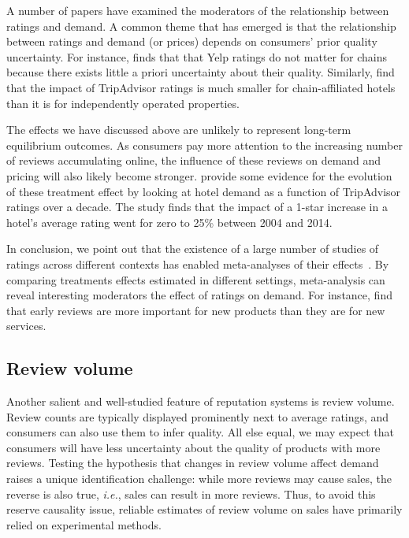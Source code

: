 \documentclass[letter,12pt]{article}
\begin{document}
A number of papers have examined the moderators of the relationship between
ratings and demand. A common theme that has emerged is that the relationship
between ratings and demand (or prices) depends on consumers' prior quality
uncertainty. For instance, \citet{luca2016reviews} finds that that Yelp
ratings do not matter for chains because there exists little a priori
uncertainty about their quality. Similarly, \citet{lewis2016welfare} find that
the impact of TripAdvisor ratings is much smaller for chain-affiliated hotels
than it is for independently operated properties.

The effects we have discussed above are unlikely to represent long-term
equilibrium outcomes. As consumers pay more attention to the increasing number
of reviews accumulating online, the influence of these reviews on demand and
pricing will also likely become stronger. \cite{lewis2016welfare} provide some
evidence for the evolution of these treatment effect by looking at hotel
demand as a function of TripAdvisor ratings over a decade. The study finds
that the impact of a 1-star increase in a hotel's average rating went for zero
to 25\% between 2004 and 2014.

In conclusion, we point out that the existence of a large number of studies of
ratings across different contexts has enabled meta-analyses of their
effects~\citep{floyd2014online,babic2016effect}. By comparing treatments
effects estimated in different settings, meta-analysis can reveal interesting
moderators the effect of ratings on demand. For instance,
\cite{babic2016effect} find that early reviews are more important for new
products than they are for new services.

\subsection{Review volume}

Another salient and well-studied feature of reputation systems is review
volume. Review counts are typically displayed prominently next to average
ratings, and consumers can also use them to infer quality. All else equal, we
may expect that consumers will have less uncertainty about the quality of
products with more reviews. Testing the hypothesis that changes in review
volume affect demand raises a unique identification challenge: while more
reviews may cause sales, the reverse is also true, \emph{i.e.}, sales can
result in more reviews. Thus, to avoid this reserve causality issue, reliable
estimates of review volume on sales have primarily relied on experimental
methods.
\end{document}
